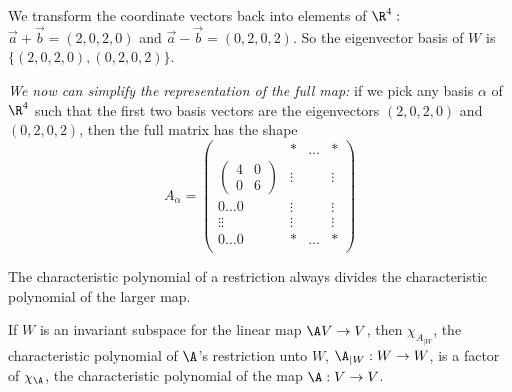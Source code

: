 \begin{example}
    We transform the coordinate vectors back into elements of $\R^4:$ $\vec{a} + \vec{b} = (2,0,2,0)$ and $\vec{a} - \vec{b} = (0,2,0,2)$.
    So the eigenvector basis of $W$ is $\{(2,0,2,0), (0,2,0,2)\}$.

    \emph{We now can simplify the representation of the full map:} if we pick any basis $\alpha$ of $\R^4$ such that the first two basis vectors
    are the eigenvectors $(2,0,2,0)$ and $(0,2,0,2)$, then the full matrix has the shape
    $$A_\alpha = \begin{pmatrix} 
                                                      & * & \dots & * \\
         \begin{pmatrix} 4 & 0 \\ 0 & 6\end{pmatrix}  & \vdots & & \vdots \\
        0  \dots  0 & \vdots & & \vdots \\
           \vdots\vdots & \vdots & & \vdots \\
        0  \dots  0 & * & \dots & * \\
    \end{pmatrix}$$
\end{example}

\begin{remark}
    The characteristic polynomial of a restriction always divides the characteristic polynomial of the larger map.
\end{remark}

\begin{theorem}
    If $W$ is an invariant subspace for the linear map $\A V \to V$, then $\chi_{A_{|W}}$, the characteristic polynomial of $\A$'s restriction unto
    $W$, $\A_{|W}: W \to W$, is a factor of $\chi_\A$, the characteristic polynomial of the map $\A: V \to V$.
\end{theorem}

